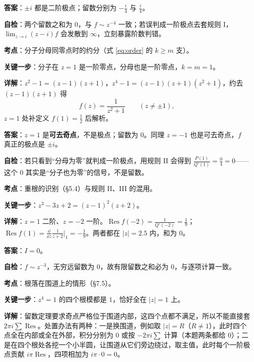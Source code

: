 \documentclass[11pt]{ctexart}
\renewcommand{\qbreak}{\needspace{0.32\textheight}}
\begin{document}
\textbf{答案}：$\pm i$ 都是二阶极点；留数分别为 $-\frac{i}{4}$ 与 $\frac{i}{4}$。

\textbf{自检}：两个留数之和为 $0$，与 $f\sim z^{-4}$ 一致；若误判成一阶极点去套规则 I，$\lim_{z\to i}(z-i)f$ 会发散到 $\infty$，立刻暴露阶数判错。

\qbreak
{}

\textbf{考点}：分子分母同零点时的约分（式 \eqref{eq:order} 的 $k\ge m$ 支）。

\textbf{关键一步}：分子在 $z=1$ 是一阶零点，分母也是一阶零点，$k=m=1$。

\textbf{详解}：$z^{2}-1=(z-1)(z+1)$，$z^{4}-1=(z-1)(z+1)(z^{2}+1)$，约去 $(z-1)(z+1)$ 得
\[ f(z)=\frac{1}{z^{2}+1}\qquad(z\ne\pm1), \]
$z=1$ 处补定义 $f(1)=\frac12$ 后解析。

\textbf{答案}：$z=1$ 是\textbf{可去奇点}，不是极点；留数为 $0$。同理 $z=-1$ 也是可去奇点，$f$ 真正的极点是 $\pm i$。

\textbf{自检}：若只看到“分母为零”就判成一阶极点，用规则 II 会得到 $\frac{P(1)}{Q'(1)}=\frac{0}{4}=0$——这个 $0$ 其实是“分子也为零”的信号，不是留数。

\qbreak
{}

\textbf{考点}：重根的识别（§5.4）与规则 II、III 的混用。

\textbf{关键一步}：$z^{3}-3z+2=(z-1)^{2}(z+2)$。

\textbf{详解}：$z=1$ 二阶、$z=-2$ 一阶。$\operatorname{Res}f(-2)=\frac{1}{Q'(-2)}=\frac19$；$\operatorname{Res}f(1)=\frac{\dd}{\dd z}\frac{1}{z+2}\big|_{1}=-\frac19$。两者都在 $|z|=2.5$ 内，和为 $0$。

\textbf{答案}：$I=0$。

\textbf{自检}：$f\sim z^{-3}$，无穷远留数为 $0$，故有限留数之和必为 $0$，与逐项计算一致。

\qbreak
{}

\textbf{考点}：根落在围道上的情形（§7.5）。

\textbf{关键一步}：$z^{4}=1$ 的四个根模都是 $1$，恰好全在 $|z|=1$ 上。

\textbf{详解}：留数定理要求奇点严格位于围道内部，这四个点都不满足，所以不能直接套 $2\pi i\sum\operatorname{Res}$。处置办法有两种：一是换围道，例如取 $|z|=R$（$R\ne1$），此时四个点全在内部或全在外部，积分分别为 $0$ 或按 $-2\pi i\sum$ 计算（本题两条都给 $0$）；二是在四个根处各挖一个小半圆，让围道从它们旁边绕过，取主值，此时每个一阶极点贡献 $i\pi\operatorname{Res}$，四项相加为 $i\pi\cdot0=0$。
\end{document}
